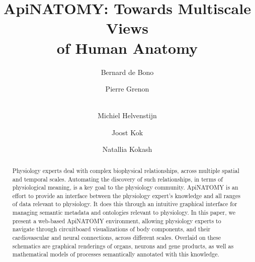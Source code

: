 \documentclass[runningheads,final]{llncs}                                                %
\begin{document}

\title{ApiNATOMY: Towards Multiscale Views\\of Human Anatomy}

\author{
  Bernard de Bono \and
  Pierre Grenon \and \\
  Michiel Helvenstijn \and
  Joost Kok \and
  Natallia Kokash
}


\maketitle

\setlength{\subfigcapskip}{0.1cm}
\setlength{\abovecaptionskip}{0cm}
\setlength{\belowcaptionskip}{0cm}
\setlength{\textfloatsep}{10pt plus 1.0pt minus 2.0pt}


\begin{abstract}
	Physiology experts deal with complex biophysical relationships, across multiple spatial
	and temporal scales. Automating the discovery of such relationships, in terms of
	physiological meaning, is a key goal to the physiology community. ApiNATOMY is an effort
	to provide an interface between the physiology expert's knowledge and all ranges of data
	relevant to physiology. It does this through an intuitive graphical interface for managing
	semantic metadata and ontologies relevant to physiology. In this paper, we present a
	web-based ApiNATOMY environment, allowing physiology experts to navigate through circuitboard
	visualizations of body components, and their cardiovascular and neural connections,
	across different scales.
	Overlaid on these schematics are graphical renderings of organs, neurons and gene products,
	as well as mathematical models of processes semantically annotated with this knowledge.
\end{abstract}













\end{document}
